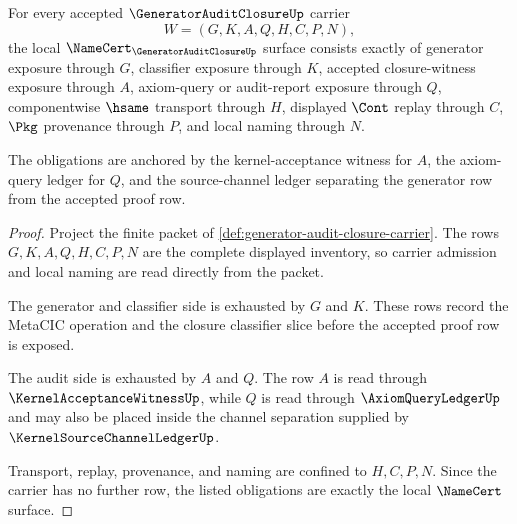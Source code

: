 \begin{theorem}
\label{thm:generator-audit-closure-namecert-obligations}
For every accepted $\GeneratorAuditClosureUp$ carrier
$$
W=(G,K,A,Q,H,C,P,N),
$$
the local $\NameCert_{\GeneratorAuditClosureUp}$ surface consists exactly of generator exposure through $G$, classifier exposure through $K$, accepted closure-witness exposure through $A$, axiom-query or audit-report exposure through $Q$, componentwise $\hsame$ transport through $H$, displayed $\Cont$ replay through $C$, $\Pkg$ provenance through $P$, and local naming through $N$.

The obligations are anchored by the kernel-acceptance witness for $A$, the axiom-query ledger for $Q$, and the source-channel ledger separating the generator row from the accepted proof row.
\end{theorem}
\begin{proof}
Project the finite packet of \autoref{def:generator-audit-closure-carrier}. The rows $G,K,A,Q,H,C,P,N$ are the complete displayed inventory, so carrier admission and local naming are read directly from the packet.

The generator and classifier side is exhausted by $G$ and $K$. These rows record the MetaCIC operation and the closure classifier slice before the accepted proof row is exposed.

The audit side is exhausted by $A$ and $Q$. The row $A$ is read through $\KernelAcceptanceWitnessUp$, while $Q$ is read through $\AxiomQueryLedgerUp$ and may also be placed inside the channel separation supplied by $\KernelSourceChannelLedgerUp$.

Transport, replay, provenance, and naming are confined to $H,C,P,N$. Since the carrier has no further row, the listed obligations are exactly the local $\NameCert$ surface.
\end{proof}

